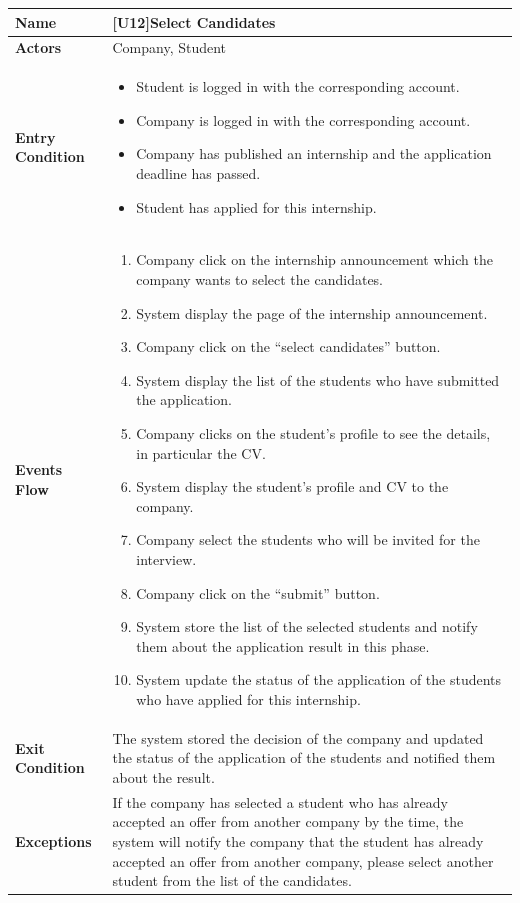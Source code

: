 \begin{center}
    \begin{tabular}{|p{9em}|p{27em}|}
        \hline
        \rowcolor{bluepoli!40} %
        \textbf{Name} & \textbf{[U12]Select Candidates} \\
        \hline
        \textbf{Actors} & Company, Student\\
        \hline
        \textbf{Entry Condition} & 
        \begin{itemize}
            \item Student is logged in with the corresponding account.
            \item Company is logged in with the corresponding account.
            \item Company has published an internship and the application deadline has passed.
            \item Student has applied for this internship.
        \end{itemize} \\
        \hline
        \textbf{Events Flow} & 
        \begin{enumerate}
            \item Company click on the internship announcement which the company wants to select the candidates.
            \item System display the page of the internship announcement.
            \item Company click on the ``select candidates'' button.
            \item System display the list of the students who have submitted the application.
            \item Company clicks on the student's profile to see the details, in particular the CV.
            \item System display the student's profile and CV to the company.
            \item Company select the students who will be invited for the interview.
            \item Company click on the ``submit'' button.
            \item System store the list of the selected students and notify them about the application result in this phase.
            \item System update the status of the application of the students who have applied for this internship.
        \end{enumerate} \\
        \hline
        \textbf{Exit Condition} & 
         The system stored the decision of the company and updated the status of the application of the students and notified them about the result.\\
        \hline
        \textbf{Exceptions} &
         If the company has selected a student who has already accepted an offer from another company by the time, the system will notify the company 
         that the student has already accepted an offer from another company, please select another student from the list of the candidates.


\end{tabular}
\end{center}
